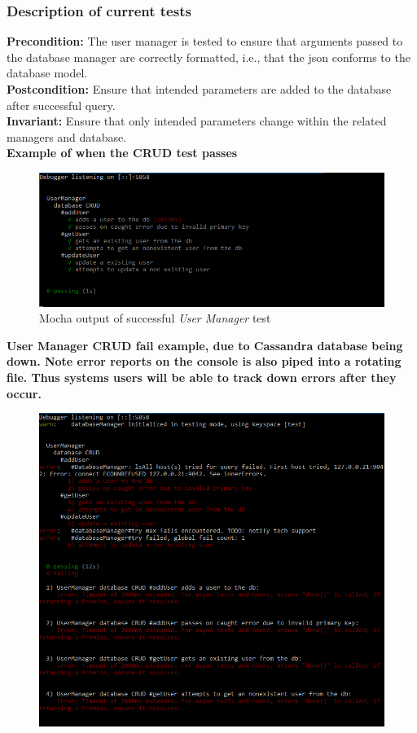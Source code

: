 \documentclass[12pt]{article}
\begin{document}
{	\subsubsection{Description of current tests}
	\textbf{Precondition:} The user manager is tested to ensure that arguments passed to the database manager are correctly formatted, i.e., that the json conforms to the database model. \\
	\textbf{Postcondition:} Ensure that intended parameters are added to the database after successful query. \\
	\textbf{Invariant:} Ensure that only intended parameters change within the related managers and database. \\
	\textbf{Example of when the CRUD test passes}
	\begin{center}
	\begin{figure}[h!]
		\includegraphics[width=\textwidth]{tests/usrCRUD/tests-pass.png}
		\caption{Mocha output of successful \textit{User Manager} test}
	\end{figure}
	\end{center}
	\textbf{User Manager CRUD fail example, due to Cassandra database being down. Note error reports on the console is also piped into a rotating file. Thus systems users will be able to track down errors after they occur.}
	\begin{center}
	\begin{figure}[h!]
		\includegraphics[width=\textwidth]{tests/usrCRUD/tests-fail.png}

\end{figure}
\end{center}}
\end{document}
